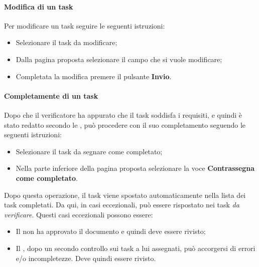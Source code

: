 \paragraph{Modifica di un task}
Per modificare un task seguire le seguenti istruzioni:
\begin{itemize}
  \item Selezionare il task da modificare;
  \item Dalla pagina proposta selezionare il campo che si vuole modificare;
  \item Completata la modifica premere il pulsante \textbf{Invio}.
\end{itemize}

\paragraph{Completamente di un task}
Dopo che il verificatore ha appurato che il task soddisfa i requisiti, e quindi è stato redatto secondo le
\textsl{\NdP}, può procedere con il suo completamento seguendo le seguenti istruzioni:
\begin{itemize}
  \item Selezionare il task da segnare come completato;
  \item Nella parte inferiore della pagina proposta selezionare la voce \textbf{Contrassegna come 
  completato}.
\end{itemize}
Dopo questa operazione, il task viene spostato automaticamente nella lista dei task completati. Da qui, in
casi eccezionali, può essere rispostato nei task \textsl{da verificare}. Questi casi eccezionali possono essere:
\begin{itemize}
  \item Il \textsl{\RdP} non ha approvato il documento e quindi deve essere 
  rivisto;
  \item Il \textsl{\Ver}, dopo un secondo controllo sui task a lui assegnati, 
  può accorgersi di errori e/o incompletezze. Deve quindi essere rivisto.
\end{itemize}